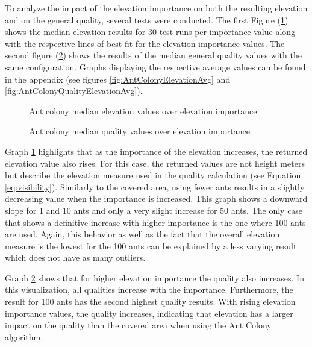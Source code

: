 To analyze the impact of the elevation importance on both the resulting elevation and on the general quality, several tests were conducted.
The first Figure (\ref{fig:AntColonyElevationMed}) shows the median elevation results for 30 test runs per importance value along with the respective lines of best fit for the elevation importance values.
The second figure (\ref{fig:AntColonyQualityElevationMed}) shows the results of the median general quality values with the same configuration.
Graphs displaying the respective average values can be found in the appendix (see figures \ref{fig:AntColonyElevationAvg} and \ref{fig:AntColonyQualityElevationAvg}).


\begin{figure}
	\centering
	
	\caption{Ant colony median elevation values over elevation importance}
	\label{fig:AntColonyElevationMed}
\end{figure}



\begin{figure}
	\centering
	
	\caption{Ant colony median quality values over elevation importance}
	\label{fig:AntColonyQualityElevationMed}
\end{figure}


Graph \ref{fig:AntColonyElevationMed} highlights that as the importance of the elevation increases, the returned elevation value also rises. 
For this case, the returned values are not height meters but describe the elevation measure used in the quality calculation (see Equation \ref{eq:visibility}).
Similarly to the covered area, using fewer ants results in a slightly decreasing value when the importance is increased. 
This graph shows a downward slope for 1 and 10 ants and only a very slight increase for 50 ants.
The only case that shows a definitive increase with higher importance is the one where 100 ants are used.
Again, this behavior as well as the fact that the overall elevation measure is the lowest for the 100 ants can be explained by a less varying result which does not have as many outliers.


Graph \ref{fig:AntColonyQualityElevationMed} shows that for higher elevation importance the quality also increases.
In this visualization, all qualities increase with the importance.
Furthermore, the result for 100 ants has the second highest quality results.
With rising elevation importance values, the quality increases, indicating that elevation has a larger impact on the quality than the covered area when using the Ant Colony algorithm. 




